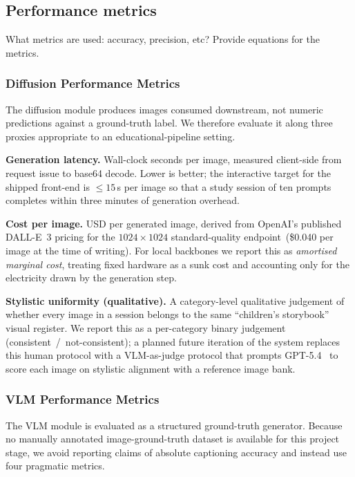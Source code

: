 \documentclass{article}
\begin{document}
\subsection{Performance metrics}
What metrics are used: accuracy, precision, etc? Provide equations for the metrics.

\subsubsection{Diffusion Performance Metrics}
\label{sec:diffusion-metrics}

The diffusion module produces images consumed downstream, not numeric
predictions against a ground-truth label. We therefore evaluate it
along three proxies appropriate to an educational-pipeline setting.

\noindent\textbf{Generation latency.}
Wall-clock seconds per image, measured client-side from request issue
to base64 decode. Lower is better; the interactive target for the
shipped front-end is $\le\!15$\,s per image so that a study session of
ten prompts completes within three minutes of generation overhead.

\noindent\textbf{Cost per image.}
USD per generated image, derived from OpenAI's published DALL-E~3
pricing for the $1024\!\times\!1024$ standard-quality
endpoint~(\$0.040 per image at the time of writing). For local
backbones we report this as \textit{amortised marginal cost},
treating fixed hardware as a sunk cost and accounting only for the
electricity drawn by the generation step.

\noindent\textbf{Stylistic uniformity (qualitative).}
A category-level qualitative judgement of whether every image in a
session belongs to the same ``children's storybook'' visual register.
We report this as a per-category binary judgement
(consistent~/~not-consistent); a planned future iteration of the
system replaces this human protocol with a VLM-as-judge protocol that
prompts GPT-5.4~\cite{openai2026gpt54} to score each image on
stylistic alignment with a reference image bank.

\subsubsection{VLM Performance Metrics}
\label{sec:vlm-metrics}

The VLM module is evaluated as a structured ground-truth generator.
Because no manually annotated image-ground-truth dataset is available
for this project stage, we avoid reporting claims of absolute captioning
accuracy and instead use four pragmatic metrics.
\end{document}
